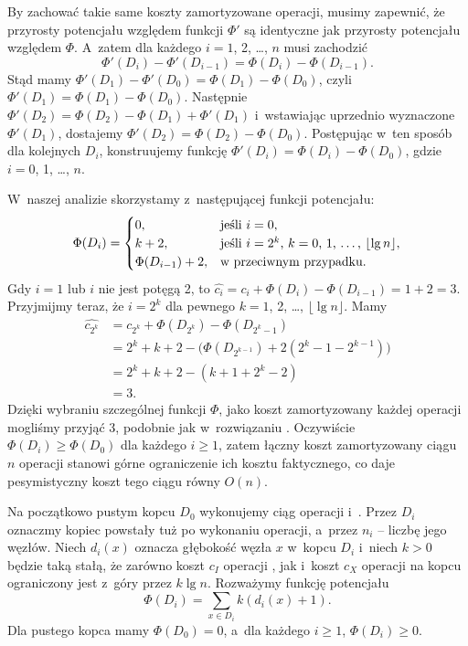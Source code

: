 
\exercise %
By zachować takie same koszty zamortyzowane operacji, musimy zapewnić, że przyrosty potencjału względem funkcji $\Phi'$ są identyczne jak przyrosty potencjału względem $\Phi$.
A~zatem dla każdego $i=1$, 2, \dots, $n$ musi zachodzić
\[
	\Phi'(D_i)-\Phi'(D_{i-1}) = \Phi(D_i)-\Phi(D_{i-1}).
\]
Stąd mamy $\Phi'(D_1)-\Phi'(D_0)=\Phi(D_1)-\Phi(D_0)$, czyli $\Phi'(D_1)=\Phi(D_1)-\Phi(D_0)$.
Następnie $\Phi'(D_2)=\Phi(D_2)-\Phi(D_1)+\Phi'(D_1)$ i~wstawiając uprzednio wyznaczone $\Phi'(D_1)$, dostajemy $\Phi'(D_2)=\Phi(D_2)-\Phi(D_0)$.
Postępując w~ten sposób dla kolejnych $D_i$, konstruujemy funkcję $\Phi'(D_i)=\Phi(D_i)-\Phi(D_0)$, gdzie $i=0$, 1, \dots, $n$.

\exercise %
W~naszej analizie skorzystamy z~następującej funkcji potencjału:
\[
	\Phi(D_i) = \begin{cases}
		0, & \text{jeśli $i=0$}, \\
		k+2, & \text{jeśli $i=2^k$, $k=0$, 1, \dots, $\lfloor\lg n\rfloor$}, \\
		\Phi(D_{i-1})+2, & \text{w~przeciwnym przypadku}.
	\end{cases}
\]
Gdy $i=1$ lub $i$ nie jest potęgą 2, to $\widehat{c_i}=c_i+\Phi(D_i)-\Phi(D_{i-1})=1+2=3$.
Przyjmijmy teraz, że $i=2^k$ dla pewnego $k=1$, 2, \dots, $\lfloor\lg n\rfloor$.
Mamy
\begin{align*}
	\widehat{c_{2^k}} &= c_{2^k}+\Phi(D_{2^k})-\Phi(D_{2^k-1}) \\
	&= 2^k+k+2-\bigl(\Phi(D_{2^{k-1}})+2(2^k-1-2^{k-1})\bigr) \\
	&= 2^k+k+2-(k+1+2^k-2) \\
	&= 3.
\end{align*}
Dzięki wybraniu szczególnej funkcji $\Phi$, jako koszt zamortyzowany każdej operacji mogliśmy przyjąć 3, podobnie jak w~rozwiązaniu .
Oczywiście $\Phi(D_i)\ge\Phi(D_0)$ dla każdego $i\ge1$, zatem łączny koszt zamortyzowany ciągu $n$ operacji stanowi górne ograniczenie ich kosztu faktycznego, co daje pesymistyczny koszt tego ciągu równy $O(n)$.

\exercise %
Na początkowo pustym kopcu $D_0$ wykonujemy ciąg operacji  i~.
Przez $D_i$ oznaczmy kopiec powstały tuż po wykonaniu  operacji, a~przez $n_i$ -- liczbę jego węzłów.
Niech $d_i(x)$ oznacza głębokość węzła $x$ w~kopcu $D_i$ i~niech $k>0$ będzie taką stałą, że zarówno koszt $c_I$ operacji , jak i~koszt $c_X$ operacji  na  kopcu ograniczony jest z~góry przez $k\lg n$.
Rozważymy funkcję potencjału
\[
	\Phi(D_i) = \sum_{x\in D_i}k(d_i(x)+1).
\]
Dla pustego kopca mamy $\Phi(D_0)=0$, a~dla każdego $i\ge1$, $\Phi(D_i)\ge0$.

